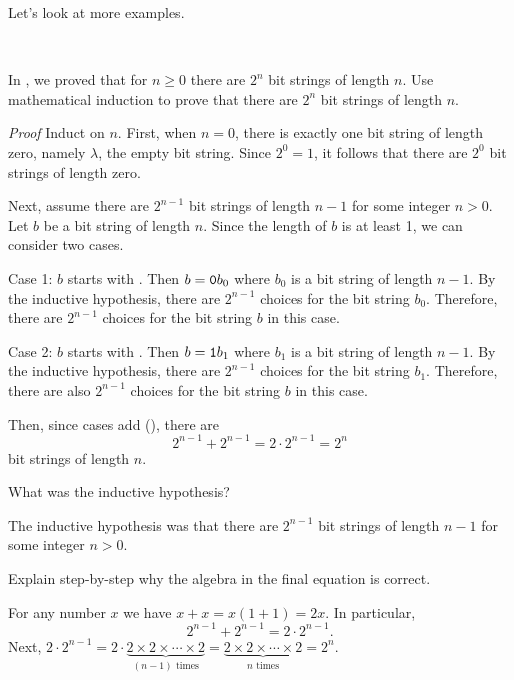 Let's look at more examples.

\begin{exam}
\label{exam_math_ind_number_bs}
~
    \begin{apart}
        \item In , we proved that for $n \ge 0$ there are $2^n$ bit strings of length $n$.  Use mathematical induction to prove that there are $2^n$ bit strings of length $n$.
            \begin{soln}
                \emph{Proof} Induct on $n$. First, when $n=0$, there is exactly one bit string of length zero, namely $\lambda$, the empty bit string.  Since $2^0=1$, it follows that there are $2^0$ bit strings of length zero.

                Next, assume there are $2^{n-1}$ bit strings of length $n-1$ for some integer $n > 0$.  Let $b$ be a bit string of length $n$. Since the length of $b$ is at least 1, we can consider two cases.  
                
                Case 1: $b$ starts with .  Then $b=\texttt{0}b_0$ where $b_0$ is a bit string of length $n-1$.  By the inductive hypothesis, there are $2^{n-1}$ choices for the bit string $b_0$.  Therefore, there are $2^{n-1}$ choices for the bit string $b$ in this case.  

                Case 2: $b$ starts with .  Then $b=\texttt{1}b_1$ where $b_1$ is a bit string of length $n-1$.  By the inductive hypothesis, there are $2^{n-1}$ choices for the bit string $b_1$.  Therefore, there are also $2^{n-1}$ choices for the bit string $b$ in this case.

                Then, since cases add (), there are $$2^{n-1}+2^{n-1}=2\cdot2^{n-1}=2^n$$ bit strings of length $n$. 
            \end{soln}
        \item What was the inductive hypothesis? 
            \begin{soln}
                The inductive hypothesis was that there are $2^{n-1}$ bit strings of length $n-1$ for some integer $n > 0$.
            \end{soln}
        \item Explain step-by-step why the algebra in the final equation is correct. 
            \begin{soln}
                For any number $x$ we have $x+x=x(1+1)=2x$.  In particular, $$2^{n-1}+2^{n-1}=2\cdot2^{n-1}.$$
                Next, 
                $2\cdot2^{n-1}= 2 \cdot \underbrace{2 \times 2 \times \cdots \times 2}_{(n-1) \text{ times}}=  \underbrace{2 \times 2 \times \cdots \times 2}_{n \text{ times}}=2^n.$
            \end{soln}
    \end{apart}
\end{exam}

